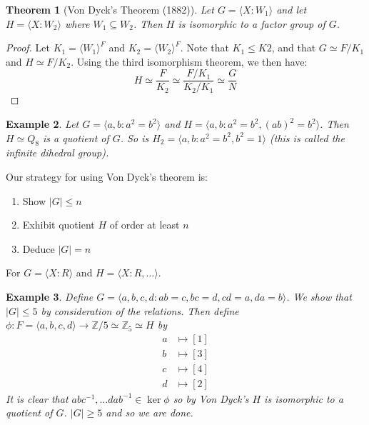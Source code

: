 \documentclass[a4paper,10pt]{article}
\newcommand{\ZZ}{\mathbb{Z}}
\newtheorem{thm}{Theorem}
\newtheorem{eg}[thm]{Example}
\begin{document}
\begin{thm}[Von Dyck's Theorem (1882)]
Let $G = \langle X : W_1 \rangle$ and let $H = \langle X : W_2 \rangle$ where $W_1 \subseteq W_2$. Then $H$ is isomorphic to a factor group of $G$. 
\end{thm}

\begin{proof}
Let $K_1 = \langle W_1 \rangle^F$ and $K_2 = \langle W_2 \rangle^F$. Note that $K_1 \leq K2$, and that $G \simeq F / K_1$ and $H \simeq F / K_2$. Using the third isomorphism theorem, we then have:
\[ H \simeq \frac{F}{K_2} \simeq \frac{F / K_1}{K_2 / K_1} \simeq \frac{G}{N} \]
\end{proof}

\begin{eg}
Let $G = \langle a,b : a^2 = b^2 \rangle$ and $H = \langle a,b : a^2 = b^2, (ab)^2 = b^2 \rangle$. Then $H \simeq Q_8$ is a quotient of $G$. So is $H_2 = \langle a,b : a^2 = b^2, b^2 = 1 \rangle$ (this is called the infinite dihedral group). 
\end{eg}

Our strategy for using Von Dyck's theorem is: 
\begin{enumerate}
\item Show $|G| \leq n$
\item Exhibit quotient $H$ of order at least $n$
\item Deduce $|G| = n$
\end{enumerate}
For $G = \langle X : R \rangle$ and $H = \langle X : R, \dots \rangle$. 


\begin{eg}
Define $G = \langle a,b,c,d : ab = c, bc = d, cd = a, da = b \rangle$. We show that $|G| \leq 5$ by consideration of the relations. Then define $\phi : F = \langle a,b,c,d\rangle \rightarrow \ZZ / 5 \simeq \ZZ_5 \simeq H$ by 
\begin{align*}
a &\mapsto [1] \\
b &\mapsto [3] \\
c &\mapsto [4] \\
d &\mapsto [2]
\end{align*}
It is clear that $abc^{-1}, \dots dab^{-1} \in \ker\phi$ so by Von Dyck's $H$ is isomorphic to a quotient of $G$. $|G| \geq 5$ and so we are done. 
\end{eg}
\end{document}
